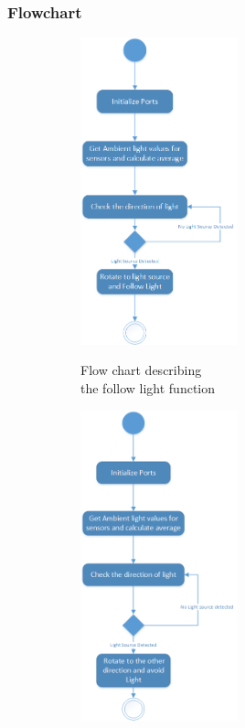 \subsubsection{Flowchart}
\begin{figure}
	\centering
	\captionsetup[subfigure]{justification=centering}
	\begin{subfigure}{0.45\textwidth}
		\centering
		\includegraphics[width=0.5\textwidth]{figures/FollowLight.png}
		\label{fig:flowFollowLight}
		\caption{Flow chart describing \\ the follow light function}
	\end{subfigure}
	\begin{subfigure}{0.45\textwidth}
		\centering
		\includegraphics[width=0.5\textwidth]{figures/AvoidLight.png}

\end{subfigure}
\end{figure}
